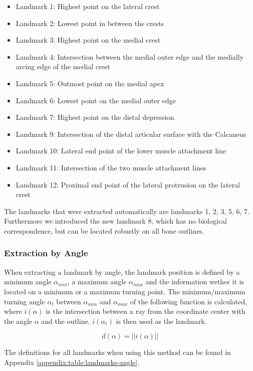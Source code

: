 \documentclass[pdftex,12pt,a4paper]{report}
\begin{document}
\begin{itemize}
\item Landmark 1: Highest point on the lateral crest
\item Landmark 2: Lowest point in between the crests
\item Landmark 3: Highest point on the medial crest
\item Landmark 4: Intersection between the medial outer edge and the medially arcing edge of the medial crest
\item Landmark 5: Outmost point on the medial apex
\item Landmark 6: Lowest point on the medial outer edge
\item Landmark 7: Highest point on the distal depression
\item Landmark 9: Intersection of the distal articular surface with the Calcaneus
\item Landmark 10: Lateral end point of the lower muscle attachment line
\item Landmark 11: Intersection of the two muscle attachment lines
\item Landmark 12: Proximal end point of the lateral protrusion on the lateral crest
\end{itemize}

The landmarks that were extracted automatically are landmarks 1, 2, 3, 5, 6, 7. Furthermore we introduced the new
landmark 8, which has no biological correspondence, but can be located robustly on all bone outlines.

\subsubsection{Extraction by Angle}

When extracting a landmark by angle, the landmark position is defined by a minimum angle $\alpha_{min}$, a maximum
angle $\alpha_{max}$ and the information wether it is located on a minimum or a maximum turning point.
The minimum/maximum turning angle $\alpha_{t}$ between $\alpha_{min}$ and $\alpha_{max}$ of the following function
is calculated, where $i(\alpha)$ is the intersection between a ray from the coordinate center with the angle $\alpha$ and
the outline. $i(\alpha_t)$ is then used as the landmark.

\begin{equation}
d(\alpha) = ||i(\alpha)||
\end{equation}

The definitions for all landmarks when using this method can be found in Appendix \ref{appendix:table:landmarks-angle}.
\end{document}
